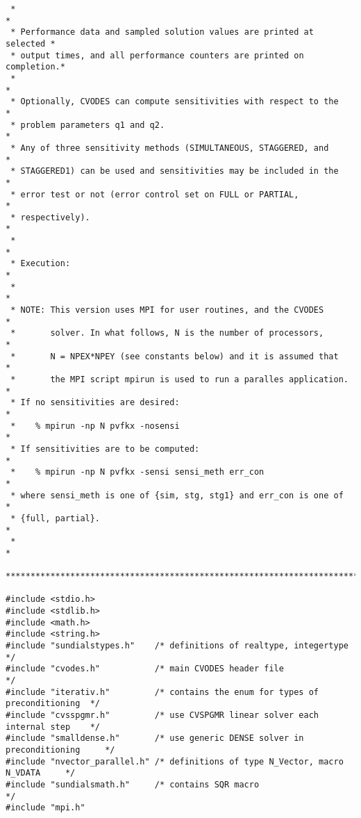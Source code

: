 \begin{verbatim}
 *                                                                      *
 * Performance data and sampled solution values are printed at selected *
 * output times, and all performance counters are printed on completion.*
 *                                                                      *
 * Optionally, CVODES can compute sensitivities with respect to the     *
 * problem parameters q1 and q2.                                        *
 * Any of three sensitivity methods (SIMULTANEOUS, STAGGERED, and       *
 * STAGGERED1) can be used and sensitivities may be included in the     *
 * error test or not (error control set on FULL or PARTIAL,             *
 * respectively).                                                       *
 *                                                                      *
 * Execution:                                                           *
 *                                                                      *
 * NOTE: This version uses MPI for user routines, and the CVODES        *
 *       solver. In what follows, N is the number of processors,        *
 *       N = NPEX*NPEY (see constants below) and it is assumed that     *
 *       the MPI script mpirun is used to run a paralles application.   *
 * If no sensitivities are desired:                                     *
 *    % mpirun -np N pvfkx -nosensi                                     *
 * If sensitivities are to be computed:                                 *
 *    % mpirun -np N pvfkx -sensi sensi_meth err_con                    *
 * where sensi_meth is one of {sim, stg, stg1} and err_con is one of    *
 * {full, partial}.                                                     *
 *                                                                      *
 ************************************************************************/

#include <stdio.h>
#include <stdlib.h>
#include <math.h>
#include <string.h>
#include "sundialstypes.h"    /* definitions of realtype, integertype            */
#include "cvodes.h"           /* main CVODES header file                         */
#include "iterativ.h"         /* contains the enum for types of preconditioning  */
#include "cvsspgmr.h"         /* use CVSPGMR linear solver each internal step    */
#include "smalldense.h"       /* use generic DENSE solver in preconditioning     */
#include "nvector_parallel.h" /* definitions of type N_Vector, macro N_VDATA     */
#include "sundialsmath.h"     /* contains SQR macro                              */
#include "mpi.h"



\end{verbatim}
